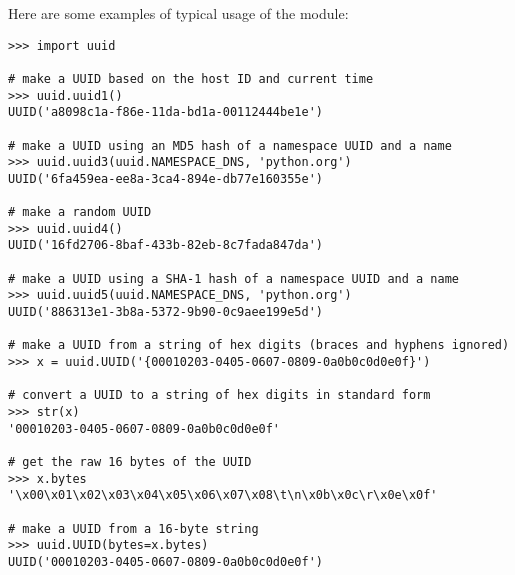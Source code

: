 Here are some examples of typical usage of the  module:
\begin{verbatim}
>>> import uuid

# make a UUID based on the host ID and current time
>>> uuid.uuid1()
UUID('a8098c1a-f86e-11da-bd1a-00112444be1e')

# make a UUID using an MD5 hash of a namespace UUID and a name
>>> uuid.uuid3(uuid.NAMESPACE_DNS, 'python.org')
UUID('6fa459ea-ee8a-3ca4-894e-db77e160355e')

# make a random UUID
>>> uuid.uuid4()
UUID('16fd2706-8baf-433b-82eb-8c7fada847da')

# make a UUID using a SHA-1 hash of a namespace UUID and a name
>>> uuid.uuid5(uuid.NAMESPACE_DNS, 'python.org')
UUID('886313e1-3b8a-5372-9b90-0c9aee199e5d')

# make a UUID from a string of hex digits (braces and hyphens ignored)
>>> x = uuid.UUID('{00010203-0405-0607-0809-0a0b0c0d0e0f}')

# convert a UUID to a string of hex digits in standard form
>>> str(x)
'00010203-0405-0607-0809-0a0b0c0d0e0f'

# get the raw 16 bytes of the UUID
>>> x.bytes
'\x00\x01\x02\x03\x04\x05\x06\x07\x08\t\n\x0b\x0c\r\x0e\x0f'

# make a UUID from a 16-byte string
>>> uuid.UUID(bytes=x.bytes)
UUID('00010203-0405-0607-0809-0a0b0c0d0e0f')
\end{verbatim}
